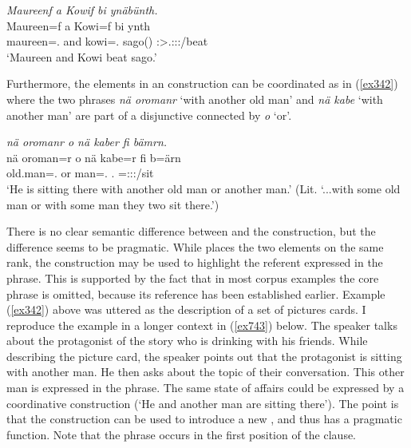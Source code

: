 \begin{exe}
	\ex \emph{Maureenf a Kowif bi ynäbünth.}\\
	\gll Maureen=f a Kowi=f bi ynth\\
	maureen=\Erg.\Sg{} and kowi=\Erg.\Sg{} sago(\Abs) \Stdu:\Sbj>\Tsg.\Masc:\Obj:\Nonpast:\Ipfv/beat\\
	\trans `Maureen and Kowi beat sago.'
	\label{ex726}
\end{exe}

Furthermore, the elements in an  construction can be coordinated as in (\ref{ex342}) where the two  phrases \emph{nä oromanr} `with another old man' and \emph{nä kabe} `with another man' are part of a disjunctive  connected by \emph{o} `or'.

\begin{exe}
	\ex \emph{nä oromanr o nä kaber fi bämrn.}\\
	\gll nä {oroman=r} o nä kabe=r fi b=ärn\\
	\Indf{} {old.man=\Assoc.\Du} or \Indf{} man=\Assoc.\Du{} \Third.\Abs{} \Med=\Stdu:\Sbj:\Nonpast:\Ipfv/sit\\
	\trans `He is sitting there with another old man or another man.' (Lit. `...with some old man or with some man they two sit there.')
	\label{ex342}
\end{exe}

There is no clear semantic difference between  and the  construction, but the difference seems to be pragmatic. While  places the two elements on the same rank, the  construction may be used to highlight the referent expressed in the  phrase. This is supported by the fact that in most corpus examples the core phrase is omitted, because its reference has been established earlier. Example (\ref{ex342}) above was uttered as the description of a set of pictures cards. I reproduce the example in a longer context in (\ref{ex743}) below. The speaker talks about the protagonist of the story who is drinking with his friends. While describing the picture card, the speaker points out that the protagonist is sitting with another man. He then asks about the topic of their conversation. This other man is expressed in the  phrase. The same state of affairs could be expressed by a coordinative construction (`He and another man are sitting there'). The point is that the  construction can be used to introduce a new , and thus has a pragmatic function. Note that the  phrase occurs in the first position of the clause.

